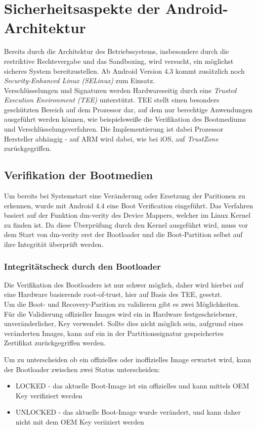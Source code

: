 \section{Sicherheitsaspekte der Android-Architektur}

	Bereits durch die Architektur des Betriebssystems, insbesondere durch die restriktive Rechtevergabe und das Sandboxing, wird versucht, ein möglichst sicheres System bereitzustellen. Ab Android Version 4.3 kommt zusätzlich noch \textit{Security-Enhanced Linux (SELinux)} zum Einsatz.\\
	Verschlüsselungen und Signaturen werden Hardwareseitig durch eine \textit{Trusted Execution Environment (TEE)} unterstützt. TEE stellt einen besonders geschützten Bereich auf dem Prozessor dar, auf dem nur berechtige Anwendungen ausgeführt werden können, wie beispielsweiße die Verifikation des Bootmediums und Verschlüsselungsverfahren. Die Implementierung ist dabei Prozessor Hersteller abhängig - auf ARM wird dabei, wie bei iOS, auf \textit{TrustZone}\cite{TEE_ARM} zurückgegriffen.
	
	\subsection{Verifikation der Bootmedien}
	Um bereits bei Systemstart eine Veränderung oder Ersetzung der Paritionen zu erkennen, wurde mit Android 4.4 eine Boot Verification eingeführt. Das Verfahren basiert auf der Funktion dm-verity des Device Mappers, welcher im Linux Kernel zu finden ist. Da diese Überprüfung durch den Kernel ausgeführt wird, muss vor dem Start von dm-verity erst der Bootloader und die Boot-Partition selbst auf ihre Integrität überprüft werden.
	
	\subsubsection{Integritätscheck durch den Bootloader}
	Die Verifikation des Bootloaders ist nur schwer möglich, daher wird hierbei auf eine Hardware basierende root-of-trust, hier auf Basis des TEE, gesetzt. \\
	Um die Boot- und Recovery-Parition zu validieren gibt es zwei Möglichkeiten. Für die Validierung offizieller Images wird ein in Hardware festgeschriebener, unveränderlicher, Key verwendet. Sollte dies nicht möglich sein, aufgrund eines veränderten Images, kann auf ein in der Partitionssignatur gespeichertes Zertifikat zurückgegriffen werden.
\begin{flushleft}	
	Um zu unterscheiden ob ein offizielles oder inoffizielles Image erwartet wird, kann der Bootloader zwischen zwei Status unterscheiden:\\
\end{flushleft}
	\begin{itemize}\itemsep0pt
		\item LOCKED - das aktuelle Boot-Image ist ein offizielles und kann mittels OEM Key verifiziert werden
		\item UNLOCKED - das aktuelle Boot-Image wurde verändert, und kann daher nicht mit dem OEM Key veriiziert werden
	\end{itemize}
	
